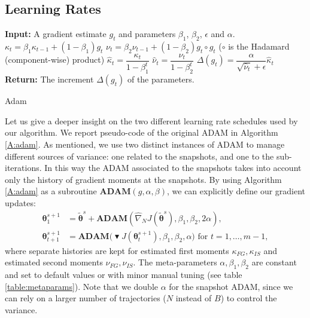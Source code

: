 \documentclass{article}
\theoremstyle{remark}
\theoremstyle{definition}
\newcommand{\vtheta}{\boldsymbol{\theta}}
\newcommand{\wt}[1]{\widetilde{#1}}
\newcommand{\wh}[1]{\widehat{#1}}
\begin{document}
\subsection{Learning Rates}
\begin{algorithm}[h]
	\begin{algorithmic}
		\STATE \textbf{Input:} A gradient estimate $g_t$ and parameters $\beta_1$, $\beta_2$, $\epsilon$ and $\alpha$.
		\STATE $\kappa_t = \beta_1 \kappa_{t-1} + (1 - \beta_1) g_t$
		\STATE $\nu_t = \beta_2 \nu_{t-1} + (1 - \beta_2) g_t \circ g_t$ ($\circ$ is the Hadamard (component-wise) product)
		\STATE $\hat{\kappa}_t = \dfrac{\kappa_t}{1 - \beta^t_1}$
		\STATE $\hat{\nu}_t = \dfrac{\nu_t}{1 - \beta^t_2}$
		\STATE $\Delta(g_t) = \dfrac{\alpha}{\sqrt{\hat{\nu}_t} + \epsilon} \hat{\kappa}_t$
		\STATE \textbf{Return:} The increment $\Delta(g_t)$  of the parameters.
	\end{algorithmic}
	\caption{
		\label{A:adam}
		Adam}
\end{algorithm}
Let us give a deeper insight on the two different learning rate schedules used by our algorithm. We report pseudo-code of the original ADAM \cite{kingma2014adam} in Algorithm \ref{A:adam}. As mentioned, we use two distinct instances of ADAM to manage different sources of variance: one related to the snapshots, and one to the sub-iterations. In this way the ADAM associated to the snapshots takes into account only the history of gradient moments at the snapshots. By using Algorithm \ref{A:adam} as a subroutine $\textbf{ADAM}(g,\alpha,\beta)$, we can explicitly define our gradient updates:
\begin{align*}
\vtheta^{s+1}_1 &= \wt{\vtheta}^s + \textbf{ADAM}\left(\wh{\nabla}_N J(\wt{\vtheta}^s),\beta_1,\beta_2,2\alpha\right),\\
\vtheta^{s+1}_{t+1} &= \textbf{ADAM}\Big( 
\blacktriangledown J(\vtheta^{s+1}_t),\beta_1,\beta_2,\alpha\Big)
\text{ for $t=1,\dots,m-1$},
\end{align*}
where separate histories are kept for estimated first moments $\kappa_{FG},\kappa_{IS}$ and estimated second moments $\nu_{FG},\nu_{IS}$.
The meta-parameters $\alpha,\beta_1,\beta_2$ are constant and set to default values or with minor manual tuning (see table \ref{table:metaparams}). Note that we double $\alpha$ for the snapshot ADAM, since we can rely on a larger number of trajectories ($N$ instead of $B$) to control the variance. 
\end{document}
